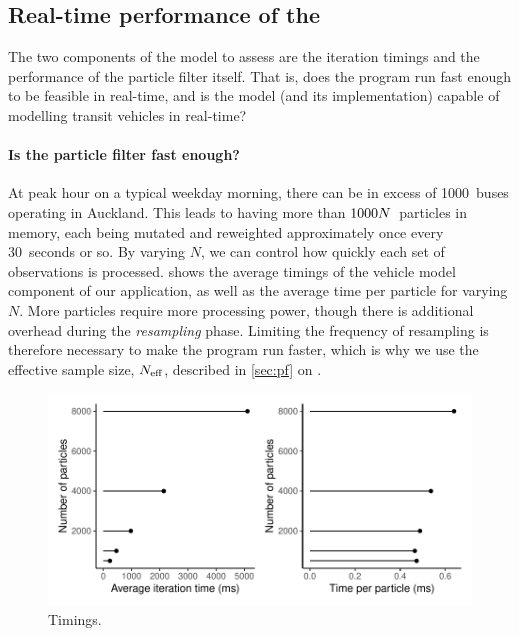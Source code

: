 \subsection{Real-time performance of the \pf{}}
\label{sec:pf_issues}



The two components of the model to assess are the iteration timings and the performance of the particle filter itself. That is, does the program run fast enough to be feasible in real-time, and is the model (and its \pf{} implementation) capable of modelling transit vehicles in real-time?


\paragraph{Is the particle filter fast enough?}
At peak hour on a typical weekday morning, there can be in excess of 1000~buses operating in Auckland. This leads to having more than $1000N$~particles in memory, each being mutated and reweighted approximately once every 30~seconds or so. By varying $N$, we can control how quickly each set of observations is processed.  shows the average timings of the vehicle model component of our application, as well as the average time per particle for varying $N$. More particles require more processing power, though there is additional overhead during the \emph{resampling} phase. Limiting the frequency of resampling is therefore necessary to make the program run faster, which is why we use the effective sample size, $N_\text{eff}$, described in \cref{sec:pf} on .


\begin{knitrout}\small
{}\color{fgcolor}\begin{figure}

{\centering \includegraphics[width=.8\textwidth]{figure/pf_timings-1} 

}

\caption[Timings]{Timings.}\label{fig:pf_timings}
\end{figure}


\end{knitrout}


